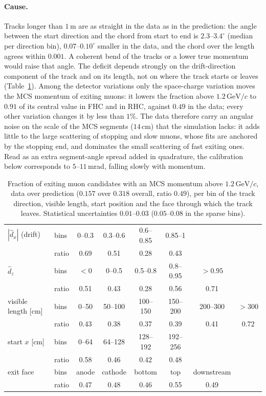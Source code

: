 \documentclass[11pt,a4paper]{article}
\newcommand{\GeVc}{\,\text{GeV}\!/c}
\begin{document}
\paragraph{Cause.} Tracks longer than $1\,$m are as straight in the data as in the prediction: the angle between
the start direction and the chord from start to end is $2.3$--$3.4^\circ$ (median per direction bin), $0.07$--$0.10^\circ$
smaller in the data, and the chord over the length agrees within $0.001$. A coherent bend of the tracks or a lower true
momentum would raise that angle. The deficit depends strongly on the drift-direction component of the track and on its
length, not on where the track starts or leaves (Table~\ref{tab:mcs_cr_cause}). Among the detector variations only the
space-charge variation moves the MCS momentum of exiting muons: it lowers the fraction above $1.2\GeVc$ to $0.91$ of its
central value in FHC and in RHC, against $0.49$ in the data; every other variation changes it by less than $1\%$. The
data therefore carry an angular noise on the scale of the MCS segments ($14\,$cm) that the simulation lacks: it adds
little to the large scattering of stopping and slow muons, whose fits are anchored by the stopping end, and dominates
the small scattering of fast exiting ones. Read as an extra segment-angle spread added in quadrature, the calibration
below corresponds to $5$--$11\,$mrad, falling slowly with momentum.

\begin{table}[H]
  \centering\small
  \begin{tabular}{llcccccc}
    \toprule
    $|\hat{d}_x|$ (drift) & bins & 0--0.3 & 0.3--0.6 & 0.6--0.85 & 0.85--1 & & \\
     & ratio & 0.69 & 0.51 & 0.28 & 0.43 & & \\
    $\hat{d}_z$ & bins & $<0$ & 0--0.5 & 0.5--0.8 & 0.8--0.95 & $>0.95$ & \\
     & ratio & 0.51 & 0.43 & 0.28 & 0.56 & 0.71 & \\
    visible length [cm] & bins & 0--50 & 50--100 & 100--150 & 150--200 & 200--300 & $>300$ \\
     & ratio & 0.43 & 0.38 & 0.37 & 0.39 & 0.41 & 0.72 \\
    start $x$ [cm] & bins & 0--64 & 64--128 & 128--192 & 192--256 & & \\
     & ratio & 0.58 & 0.46 & 0.42 & 0.48 & & \\
    exit face & bins & anode & cathode & bottom & top & downstream & \\
     & ratio & 0.47 & 0.48 & 0.46 & 0.55 & 0.49 & \\
    \bottomrule
  \end{tabular}
  \caption{Fraction of exiting muon candidates with an MCS momentum above $1.2\GeVc$, data over prediction ($0.157$
    over $0.318$ overall, ratio $0.49$), per bin of the track direction, visible length, start position and the face
    through which the track leaves. Statistical uncertainties $0.01$--$0.03$ ($0.05$--$0.08$ in the sparse bins).}
  \label{tab:mcs_cr_cause}
\end{table}
\end{document}

